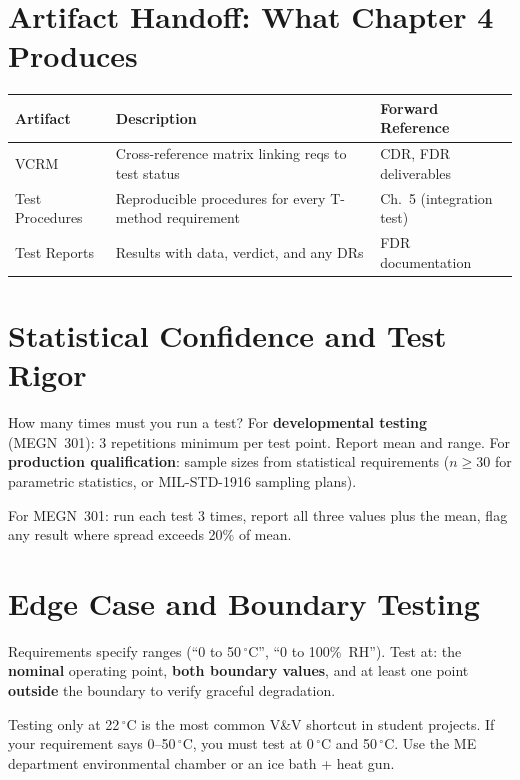\documentclass[11pt,letterpaper,twoside,openany]{book}
\newcommand{\degC}{\ensuremath{{}^{\circ}\text{C}}}
\begin{document}
\section{Artifact Handoff: What Chapter 4 Produces}
\begin{table}[htbp]\centering\small
\begin{tabularx}{\textwidth}{l X l}
\toprule
\textbf{Artifact} & \textbf{Description} & \textbf{Forward Reference} \\
\midrule
VCRM & Cross-reference matrix linking reqs to test status & CDR, FDR deliverables \\
Test Procedures & Reproducible procedures for every T-method requirement & Ch.~5 (integration test) \\
Test Reports & Results with data, verdict, and any DRs & FDR documentation \\
\bottomrule
\end{tabularx}
\end{table}


\section{Statistical Confidence and Test Rigor}
How many times must you run a test? For \textbf{developmental testing} (MEGN~301): 3 repetitions minimum per test point. Report mean and range. For \textbf{production qualification}: sample sizes from statistical requirements ($n \geq 30$ for parametric statistics, or MIL-STD-1916 sampling plans).

For MEGN~301: run each test 3 times, report all three values plus the mean, flag any result where spread exceeds 20\% of mean.

\section{Edge Case and Boundary Testing}
Requirements specify ranges (``0 to 50\,\degC{}'', ``0 to 100\%\ RH''). Test at: the \textbf{nominal} operating point, \textbf{both boundary values}, and at least one point \textbf{outside} the boundary to verify graceful degradation.

\begin{tipbox}
Testing only at 22\,\degC{} is the most common V\&V shortcut in student projects. If your requirement says 0--50\,\degC{}, you must test at 0\,\degC{} and 50\,\degC{}. Use the ME department environmental chamber or an ice bath + heat gun.
\end{tipbox}
\end{document}
